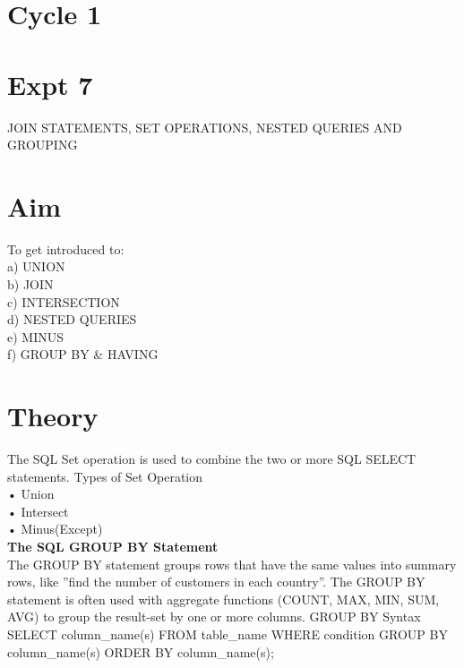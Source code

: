 \documentclass[13pt,oneside]{book}
\begin{document}
						\section*{Cycle 1}
						\section*{Expt 7}
						\begin{center}
							\Large{JOIN STATEMENTS, SET OPERATIONS, NESTED QUERIES AND GROUPING}
						\end{center}
						
						\section*{Aim}
						\large To get introduced to:\\
						a) UNION\\
						b) JOIN\\
						c) INTERSECTION\\
						d) NESTED QUERIES\\
						e) MINUS\\
						f) GROUP BY \& HAVING\\

						\section*{Theory}
						The SQL Set operation is used to combine the two or more SQL SELECT statements. Types of Set Operation\\
• Union\\
• Intersect\\
• Minus(Except)\\

\textbf{The SQL GROUP BY Statement}\\
The GROUP BY statement groups rows that have the same values into summary rows,
like ”find the number of customers in each country”.
The GROUP BY statement is often used with aggregate functions (COUNT, MAX,
MIN, SUM, AVG) to group the result-set by one or more columns. GROUP BY Syntax
SELECT column\_name(s)
FROM table_name
WHERE condition
GROUP BY column\_name(s)
ORDER BY column\_name(s);
						
\end{document}

